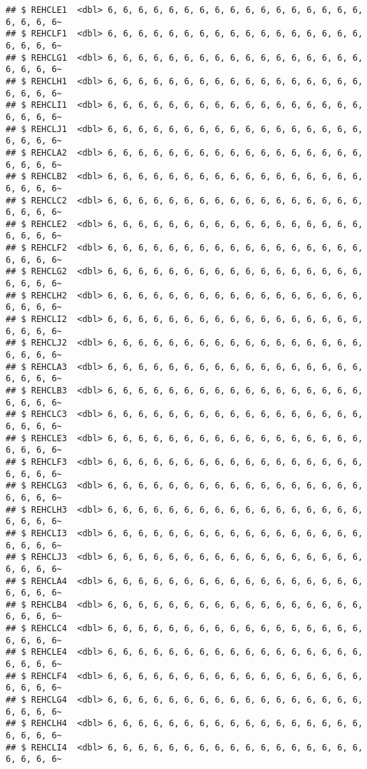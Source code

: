 \documentclass[
]{article}
\begin{document}
\begin{verbatim}
## $ REHCLE1  <dbl> 6, 6, 6, 6, 6, 6, 6, 6, 6, 6, 6, 6, 6, 6, 6, 6, 6, 6, 6, 6, 6~
## $ REHCLF1  <dbl> 6, 6, 6, 6, 6, 6, 6, 6, 6, 6, 6, 6, 6, 6, 6, 6, 6, 6, 6, 6, 6~
## $ REHCLG1  <dbl> 6, 6, 6, 6, 6, 6, 6, 6, 6, 6, 6, 6, 6, 6, 6, 6, 6, 6, 6, 6, 6~
## $ REHCLH1  <dbl> 6, 6, 6, 6, 6, 6, 6, 6, 6, 6, 6, 6, 6, 6, 6, 6, 6, 6, 6, 6, 6~
## $ REHCLI1  <dbl> 6, 6, 6, 6, 6, 6, 6, 6, 6, 6, 6, 6, 6, 6, 6, 6, 6, 6, 6, 6, 6~
## $ REHCLJ1  <dbl> 6, 6, 6, 6, 6, 6, 6, 6, 6, 6, 6, 6, 6, 6, 6, 6, 6, 6, 6, 6, 6~
## $ REHCLA2  <dbl> 6, 6, 6, 6, 6, 6, 6, 6, 6, 6, 6, 6, 6, 6, 6, 6, 6, 6, 6, 6, 6~
## $ REHCLB2  <dbl> 6, 6, 6, 6, 6, 6, 6, 6, 6, 6, 6, 6, 6, 6, 6, 6, 6, 6, 6, 6, 6~
## $ REHCLC2  <dbl> 6, 6, 6, 6, 6, 6, 6, 6, 6, 6, 6, 6, 6, 6, 6, 6, 6, 6, 6, 6, 6~
## $ REHCLE2  <dbl> 6, 6, 6, 6, 6, 6, 6, 6, 6, 6, 6, 6, 6, 6, 6, 6, 6, 6, 6, 6, 6~
## $ REHCLF2  <dbl> 6, 6, 6, 6, 6, 6, 6, 6, 6, 6, 6, 6, 6, 6, 6, 6, 6, 6, 6, 6, 6~
## $ REHCLG2  <dbl> 6, 6, 6, 6, 6, 6, 6, 6, 6, 6, 6, 6, 6, 6, 6, 6, 6, 6, 6, 6, 6~
## $ REHCLH2  <dbl> 6, 6, 6, 6, 6, 6, 6, 6, 6, 6, 6, 6, 6, 6, 6, 6, 6, 6, 6, 6, 6~
## $ REHCLI2  <dbl> 6, 6, 6, 6, 6, 6, 6, 6, 6, 6, 6, 6, 6, 6, 6, 6, 6, 6, 6, 6, 6~
## $ REHCLJ2  <dbl> 6, 6, 6, 6, 6, 6, 6, 6, 6, 6, 6, 6, 6, 6, 6, 6, 6, 6, 6, 6, 6~
## $ REHCLA3  <dbl> 6, 6, 6, 6, 6, 6, 6, 6, 6, 6, 6, 6, 6, 6, 6, 6, 6, 6, 6, 6, 6~
## $ REHCLB3  <dbl> 6, 6, 6, 6, 6, 6, 6, 6, 6, 6, 6, 6, 6, 6, 6, 6, 6, 6, 6, 6, 6~
## $ REHCLC3  <dbl> 6, 6, 6, 6, 6, 6, 6, 6, 6, 6, 6, 6, 6, 6, 6, 6, 6, 6, 6, 6, 6~
## $ REHCLE3  <dbl> 6, 6, 6, 6, 6, 6, 6, 6, 6, 6, 6, 6, 6, 6, 6, 6, 6, 6, 6, 6, 6~
## $ REHCLF3  <dbl> 6, 6, 6, 6, 6, 6, 6, 6, 6, 6, 6, 6, 6, 6, 6, 6, 6, 6, 6, 6, 6~
## $ REHCLG3  <dbl> 6, 6, 6, 6, 6, 6, 6, 6, 6, 6, 6, 6, 6, 6, 6, 6, 6, 6, 6, 6, 6~
## $ REHCLH3  <dbl> 6, 6, 6, 6, 6, 6, 6, 6, 6, 6, 6, 6, 6, 6, 6, 6, 6, 6, 6, 6, 6~
## $ REHCLI3  <dbl> 6, 6, 6, 6, 6, 6, 6, 6, 6, 6, 6, 6, 6, 6, 6, 6, 6, 6, 6, 6, 6~
## $ REHCLJ3  <dbl> 6, 6, 6, 6, 6, 6, 6, 6, 6, 6, 6, 6, 6, 6, 6, 6, 6, 6, 6, 6, 6~
## $ REHCLA4  <dbl> 6, 6, 6, 6, 6, 6, 6, 6, 6, 6, 6, 6, 6, 6, 6, 6, 6, 6, 6, 6, 6~
## $ REHCLB4  <dbl> 6, 6, 6, 6, 6, 6, 6, 6, 6, 6, 6, 6, 6, 6, 6, 6, 6, 6, 6, 6, 6~
## $ REHCLC4  <dbl> 6, 6, 6, 6, 6, 6, 6, 6, 6, 6, 6, 6, 6, 6, 6, 6, 6, 6, 6, 6, 6~
## $ REHCLE4  <dbl> 6, 6, 6, 6, 6, 6, 6, 6, 6, 6, 6, 6, 6, 6, 6, 6, 6, 6, 6, 6, 6~
## $ REHCLF4  <dbl> 6, 6, 6, 6, 6, 6, 6, 6, 6, 6, 6, 6, 6, 6, 6, 6, 6, 6, 6, 6, 6~
## $ REHCLG4  <dbl> 6, 6, 6, 6, 6, 6, 6, 6, 6, 6, 6, 6, 6, 6, 6, 6, 6, 6, 6, 6, 6~
## $ REHCLH4  <dbl> 6, 6, 6, 6, 6, 6, 6, 6, 6, 6, 6, 6, 6, 6, 6, 6, 6, 6, 6, 6, 6~
## $ REHCLI4  <dbl> 6, 6, 6, 6, 6, 6, 6, 6, 6, 6, 6, 6, 6, 6, 6, 6, 6, 6, 6, 6, 6~

\end{verbatim}
\end{document}
